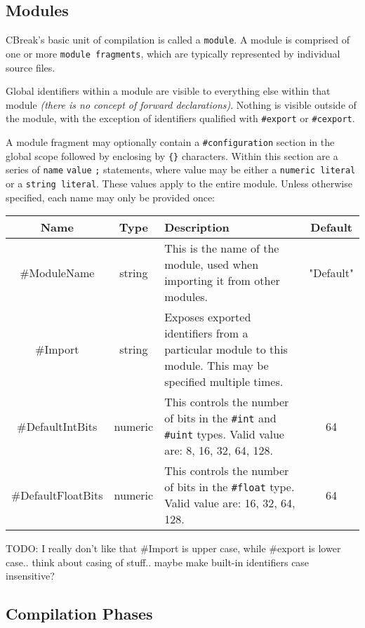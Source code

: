 \documentclass{article}
\newcommand{\code}[1]{\colorbox{light-gray}{\texttt{#1}}}
\begin{document}
\subsection{Modules}

CBreak's basic unit of compilation is called a \code{module}.  A module is comprised of one or more \code{module fragments}, which are typically represented by individual source files.

Global identifiers within a module are visible to everything else within that module \textit{(there is no concept of forward declarations)}.  Nothing is visible outside of the module, with the exception of identifiers qualified with \code{\#export} or \code{\#cexport}.

A module fragment may optionally contain a \code{\#configuration} section in the global scope followed by enclosing by \code{\{\}} characters.  Within this section are a series of \code{name} \code{value} \code{;} statements, where value may be either a \code{numeric literal} or a \code{string literal}.  These values apply to the entire module.  Unless otherwise specified, each name may only be provided once:

\begin{tabular}{ |c|c|p{10cm}|c| }
  \hline
  \textbf{Name} & \textbf{Type} & \textbf{Description} & \textbf{Default}\\\hline
  \#ModuleName & string & This is the name of the module, used when importing it from other modules. & "Default"\\\hline
  \#Import & string & Exposes exported identifiers from a particular module to this module.  This may be specified multiple times. & \\\hline
  \#DefaultIntBits & numeric & This controls the number of bits in the \code{\#int} and \code{\#uint} types.  Valid value are: 8, 16, 32, 64, 128. & 64\\\hline
  \#DefaultFloatBits & numeric & This controls the number of bits in the \code{\#float} type.  Valid value are: 16, 32, 64, 128.& 64\\\hline
\end{tabular}

TODO: I really don't like that \#Import is upper case, while \#export is lower case.. think about casing of stuff.. maybe make built-in identifiers case insensitive?

\subsection{Compilation Phases}
\end{document}
